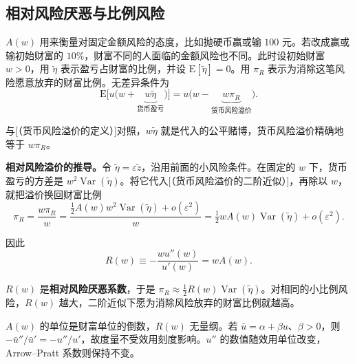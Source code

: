 \subsection{相对风险厌恶与比例风险}

$A(w)$ 用来衡量对固定金额风险的态度，比如抛硬币赢或输 $100$ 元。若改成赢或输初始财富的 $10\%$，财富不同的人面临的金额风险也不同。此时设初始财富 $w>0$，用 $\tilde\eta$ 表示盈亏占财富的比例，并设 $\mathrm E[\tilde\eta]=0$。用 $\pi_R$ 表示为消除这笔风险愿意放弃的财富比例。无差异条件为
\[
 \mathrm E\bigl[u\bigl(w+\underbrace{w\tilde\eta}_{\text{货币盈亏}}\bigr)\bigr]
 =u\bigl(w-\underbrace{w\pi_R}_{\text{货币风险溢价}}\bigr).
\]

与[（货币风险溢价的定义）]对照，$w\tilde\eta$ 就是代入的公平赌博，货币风险溢价精确地等于 $w\pi_R$。

\textbf{相对风险溢价的推导。}令 $\tilde\eta=\varepsilon\tilde z$，沿用前面的小风险条件。在固定的 $w$ 下，货币盈亏的方差是 $w^2\operatorname{Var}(\tilde\eta)$。将它代入[（货币风险溢价的二阶近似）]，再除以 $w$，就把溢价换回财富比例
\[
 \pi_R
 =\frac{w\pi_R}{w}
 =\frac{\tfrac12 A(w)w^2\operatorname{Var}(\tilde\eta)+o(\varepsilon^2)}{w}
 =\tfrac12 wA(w)\operatorname{Var}(\tilde\eta)+o(\varepsilon^2).
\]

\setcounter{equation}{4}
\hypertarget{wj-relative-risk-aversion}{}
\begin{tcolorbox}[knowledge,title=相对风险厌恶系数]
因此
\begin{equation}
    R(w)\equiv-\frac{wu''(w)}{u'(w)}=wA(w).
\label{eq:wj-seven-5}
\end{equation}
\end{tcolorbox}
$R(w)$ 是\textbf{相对风险厌恶系数}，于是 $\pi_R\approx\tfrac12R(w)\operatorname{Var}(\tilde\eta)$。对相同的小比例风险，$R(w)$ 越大，二阶近似下愿为消除风险放弃的财富比例就越高。

\begin{tcolorbox}[knowledge,title=单位与效用刻度]
$A(w)$ 的单位是财富单位的倒数，$R(w)$ 无量纲。若 $\bar u=\alpha+\beta u$、$\beta>0$，则 $-\bar u''/\bar u'=-u''/u'$，故度量不受效用刻度影响。$u''$ 的数值随效用单位改变，Arrow--Pratt 系数则保持不变。
\end{tcolorbox}

